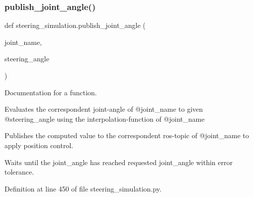 \subsubsection{\texorpdfstring{publish\_joint\_angle()}{publish\_joint\_angle()}}
{\footnotesize\ttfamily def steering\+\_\+simulation.\+publish\+\_\+joint\+\_\+angle (\begin{DoxyParamCaption}\item[{}]{joint\+\_\+name,  }\item[{}]{steering\+\_\+angle }\end{DoxyParamCaption})}



Documentation for a function. 

Evaluates the correspondent joint-\/angle of @joint\+\_\+name to given @steering\+\_\+angle using the interpolation-\/function of @joint\+\_\+name

Publishes the computed value to the correspondent ros-\/topic of @joint\+\_\+name to apply position control.

Waits until the joint\+\_\+angle has reached requested joint\+\_\+angle within error tolerance. 

Definition at line 450 of file steering\+\_\+simulation.\+py.


